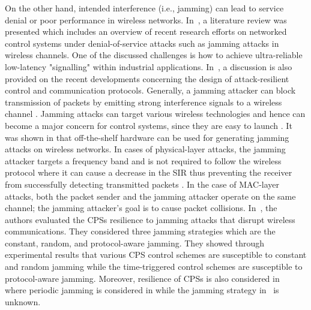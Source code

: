 On the other hand, intended interference (i.e., jamming) can lead to service denial or poor performance in wireless networks. In~\cite{8631535}, a literature review was presented which includes an overview of recent research efforts on networked control systems under denial-of-service attacks such as jamming attacks in wireless channels. One of the discussed challenges is how to achieve ultra-reliable low-latency "signalling" within industrial applications. In~\cite{Cetinkaya_2019}, a discussion is also provided on the recent developments concerning the design of attack-resilient control and communication protocols. Generally, a jamming attacker can block transmission of packets by emitting strong interference signals to a wireless channel \cite{1637931,5473884}. Jamming attacks can target various wireless technologies and hence can become a major concern for control systems, since they are easy to launch \cite{5473884}. It was shown in \cite{10.1007/978-3-319-07788-8_40} that off-the-shelf hardware can be used for generating jamming attacks on wireless networks. In cases of physical-layer attacks, the jamming attacker targets a frequency band and is not required to follow the wireless protocol where it can cause a decrease in the SIR thus preventing the receiver from successfully detecting transmitted packets \cite{10.1007/978-3-319-07788-8_40}. In the case of MAC-layer attacks, both the packet sender and the jamming attacker operate on the same channel; the jamming attacker’s goal is to cause packet collisions.
In~\cite{8726803}, the authors evaluated the CPSs resilience to jamming attacks that disrupt wireless communications. They considered three jamming strategies which are the constant, random, and protocol-aware jamming. They showed through experimental results that various CPS control schemes are susceptible to constant and random jamming while the time-triggered control schemes are susceptible to protocol-aware jamming. Moreover, resilience of CPSs is also considered in~\cite{6425868,DEPERSIS2014134,7402971,7575630} where periodic jamming is considered in \cite{6425868} while the jamming strategy in~\cite{DEPERSIS2014134,7402971,7575630} is unknown. 


